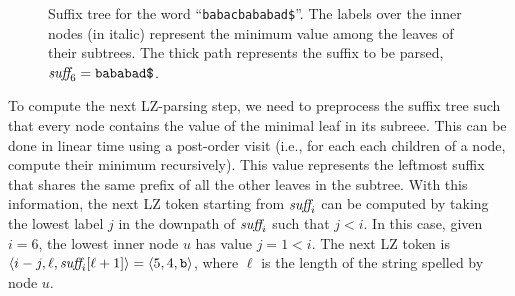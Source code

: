 \begin{figure}[t]

  \caption{Suffix tree for the word ``{\tt babacbababad\$}''. The labels over
  the inner nodes (in italic) represent the minimum value among the leaves of
  their subtrees. The thick path represents the suffix to be parsed, $\text{\it
  suff}_6 = \text{\tt bababad\$}$.}

  \label{fig:lz77-suffix-tree}
\end{figure}
%
To compute the next LZ-parsing step, we need to preprocess the suffix tree such
that every node contains the value of the minimal leaf in its subreee. This can
be done in linear time using a post-order visit (i.e., for each each children of
a node, compute their minimum recursively). This value represents the leftmost
suffix that shares the same prefix of all the other leaves in the subtree. With
this information, the next LZ token starting from $\text{\it suff}_i$ can be
computed by taking the lowest label $j$ in the downpath of $\text{\it suff}_i$
such that $j < i$. In this case, given $i = 6$, the lowest inner node $u$ has
value $j = 1 < i$. The next LZ token is $\langle i - j, \ell, \text{\it
suff}_i[\ell + 1] \rangle = \langle 5, 4, {\tt b} \rangle$, where $\ell$ is the
length of the string spelled by node $u$.
